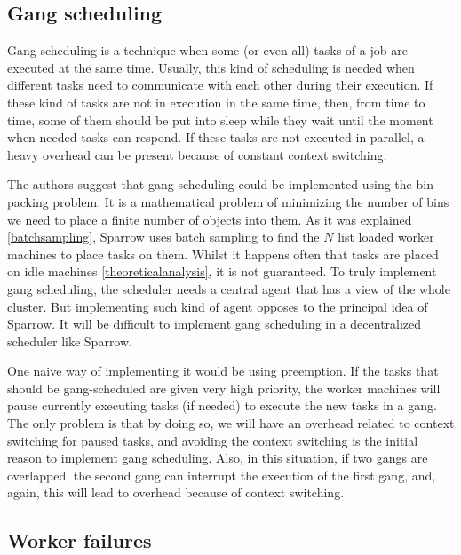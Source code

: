 \documentclass[11pt]{article}
\begin{document}
	\subsection{Gang scheduling}
		\label{gang}
	
		Gang scheduling is a technique when some (or even all) tasks of a job are executed at the same time. Usually, this kind of scheduling is needed when different tasks need to communicate with each other during their execution. If these kind of tasks are not in execution in the same time, then, from time to time, some of them should be put into sleep while they wait until the moment when needed tasks can respond. If these tasks are not executed in parallel, a heavy overhead can be present because of constant context switching.
		
		The authors \cite[section 8]{sparrow} suggest that gang scheduling could be implemented using the bin packing problem. It is a mathematical problem of minimizing the number of bins we need to place a finite number of objects into them. As it was explained \ref{batchsampling}, Sparrow uses batch sampling to find the $N$ list loaded worker machines to place tasks on them. Whilst it happens often that tasks are placed on idle machines \ref{theoreticalanalysis}, it is not guaranteed. To truly implement gang scheduling, the scheduler needs a central agent that has a view of the whole cluster. But implementing such kind of agent opposes to the principal idea of Sparrow. It will be difficult to implement gang scheduling in a decentralized scheduler like Sparrow.
		
		One naive way of implementing it would be using preemption. If the tasks that should be gang-scheduled are given very high priority, the worker machines will pause currently executing tasks (if needed) to execute the new tasks in a gang. The only problem is that by doing so, we will have an overhead related to context switching for paused tasks, and avoiding the context switching is the initial reason to implement gang scheduling. Also, in this situation, if two gangs are overlapped, the second gang can interrupt the execution of the first gang, and, again, this will lead to overhead because of context switching.
		
		
	\subsection{Worker failures}
	
\end{document}
